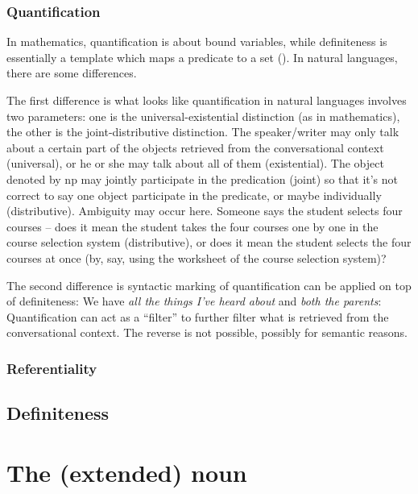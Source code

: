\documentclass[UTF8, a4paper, oneside, scheme=plain]{ctexrep}
\newcommand{\corpus}[1]{\emph{#1}}
\begin{document}
\subsubsection{Quantification}

In mathematics, quantification 
is about bound variables,
while definiteness 
is essentially a template which 
maps a predicate to a set ().
In natural languages, there are some differences.

The first difference is 
what looks like quantification in natural languages 
involves two parameters:
one is the universal-existential distinction
(as in mathematics),
the other is the joint-distributive distinction.
The speaker/writer may only talk about a certain part of the objects retrieved
from the conversational context (universal), 
or he or she may talk about all of them (existential).
The object denoted by \acs{np} may jointly participate in the predication (joint)
so that it's not correct to say 
one object participate in the predicate,
or maybe individually (distributive).
Ambiguity may occur here.
Someone says the student selects four courses -- 
does it mean the student takes the four courses one by one in the course selection system
(distributive), 
or does it mean the student selects the four courses at once 
(by, say, using the worksheet of the course selection system)?

The second difference is 
syntactic marking of quantification can be applied on top of definiteness:
We have \corpus{all the things I've heard about} 
and \corpus{both the parents}:
Quantification can act as a ``filter'' 
to further filter what is retrieved from the conversational context.
The reverse is not possible, 
possibly for semantic reasons.

\subsubsection{Referentiality}\label{sec:semantic.ref}



\subsection{Definiteness}\label{sec:semantic.definite}


\section{The (extended) noun}\label{sec:np.head}
\end{document}
